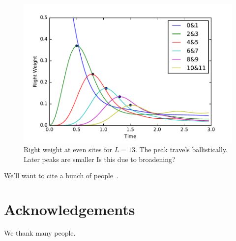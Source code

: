 \documentclass[aps,prl,reprint,superscriptaddress, longbibliography]{revtex4-1}
\newcommand{\charlie}[1]{ {\color{Magenta} {{#1}}}}
\begin{document}
\begin{figure}
	\includegraphics[width=\columnwidth]{Rweightpeakshape}
	\caption{Right weight at even sites for $L=13$. The peak travels ballistically. Later peaks are smaller \charlie{Is this due to broadening?}}
	\label{fig:Rweightpeakshape}
\end{figure}

We'll want to cite a bunch of people~\cite{Larkinotoc,Lieb72,KitaevSYK,chaosbound,HosurYoshida,ShenkerStanfordButterfly,LocalizedShocks,CotlerRM,RobertsStanford,GuQiStanford,GuQi_rcft,StanfordWeakCoupling,PatelDiffusiveMetal,ChowdhuryON,Galitski_lyapunov,DoraMoessner,LuitzScrambling,ProsenWeakChaos,AleinerOTOC,MotrunichTFIM_otoc,FradkinHuse,ChalkerFloquetChaos,FawziScrambling,opspreadAdam, opspreadCurt, TiborCons, KhemaniCons}.

\section*{Acknowledgements}
We thank many people.



\begin{appendix}


\end{appendix}
\end{document}
